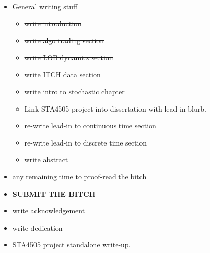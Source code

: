 \documentclass[12pt]{article}
\begin{document}
\begin{itemize}[topsep=0pt,itemsep=0ex,partopsep=0ex,parsep=0ex]
\item General writing stuff
\begin{itemize}[topsep=0pt,itemsep=0ex,partopsep=0ex,parsep=0ex]
\item \st{write introduction}
\item \st{write algo trading section}
\item \st{write LOB dynamics section}
\item write ITCH data section
\item write intro to stochastic chapter
\item Link STA4505 project into dissertation with lead-in blurb.
\item re-write lead-in to continuous time section
\item re-write lead-in to discrete time section
\item write abstract
\end{itemize}

\item any remaining time to proof-read the bitch
\item {\bf SUBMIT THE BITCH}
\item write acknowledgement
\item write dedication
\item STA4505 project standalone write-up.
\end{itemize}
\end{document}
